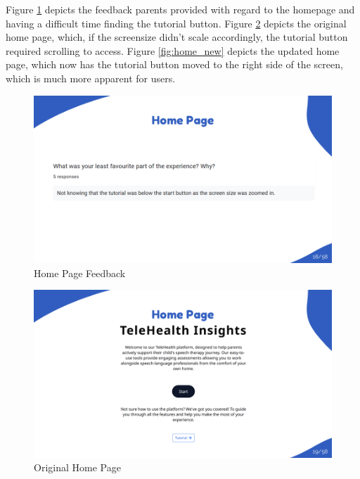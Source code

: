 \documentclass{article}
\begin{document}
Figure \ref{fig:home_feedback} depicts the feedback parents provided with regard to the homepage and having a difficult time finding the tutorial button.
Figure \ref{fig:home_original} depicts the original home page, which, if the screensize didn't scale accordingly, the tutorial button required scrolling to access.
Figure \ref{fig:home_new} depicts the updated home page, which now has the tutorial button moved to the right side of the screen, which is much more apparent for users.

\begin{figure}[H]

  \centering
  \includegraphics[width=\textwidth]{images/slide18.png}
  \caption{Home Page Feedback}
  \label{fig:home_feedback}
\end{figure}

\begin{figure}[H]
  \centering
  \includegraphics[width=\textwidth]{images/slide19.png}
  \caption{Original Home Page}
  \label{fig:home_original}
\end{figure}
\end{document}

